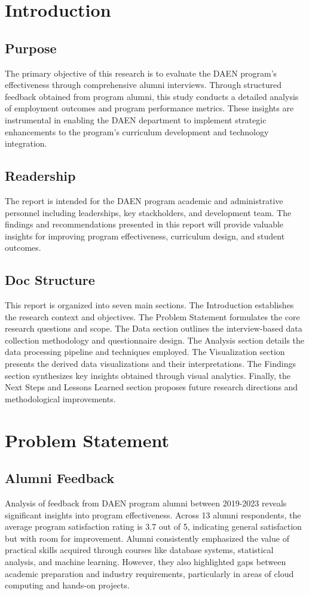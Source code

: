\documentclass[12pt,a4paper]{article}
\begin{document}
\section{Introduction}
\subsection{Purpose}
The primary objective of this research is to evaluate the DAEN 
program's effectiveness through comprehensive alumni interviews. Through structured feedback 
obtained from program alumni, this study conducts a 
detailed analysis of employment outcomes and program performance 
metrics. These insights are instrumental in enabling the DAEN 
department to implement strategic enhancements to the program's curriculum development and technology integration.

\subsection{Readership}
The report is intended for the DAEN program academic and 
administrative personnel including leaderships, key stackholders, 
and development team. The findings and recommendations presented 
in this report will provide valuable insights for improving program 
effectiveness, curriculum design, and student outcomes.

\subsection{Doc Structure}
This report is organized into seven main sections. The Introduction 
establishes the research context and objectives. The Problem 
Statement formulates the core research questions and scope. 
The Data section outlines the interview-based data collection 
methodology and questionnaire design. The Analysis section 
details the data processing pipeline and techniques employed. 
The Visualization section presents the derived data visualizations 
and their interpretations. The Findings section synthesizes key 
insights obtained through visual analytics. Finally, the Next 
Steps and Lessons Learned section proposes future research 
directions and methodological improvements.

\section{Problem Statement}
\subsection{Alumni Feedback}
Analysis of feedback from DAEN program alumni between 2019-2023 reveals significant insights into program effectiveness. Across 13 alumni respondents, the average program satisfaction rating is 3.7 out of 5, indicating general satisfaction but with room for improvement. Alumni consistently emphasized the value of practical skills acquired through courses like database systems, statistical analysis, and machine learning. However, they also highlighted gaps between academic preparation and industry requirements, particularly in areas of cloud computing and hands-on projects.
\end{document}
